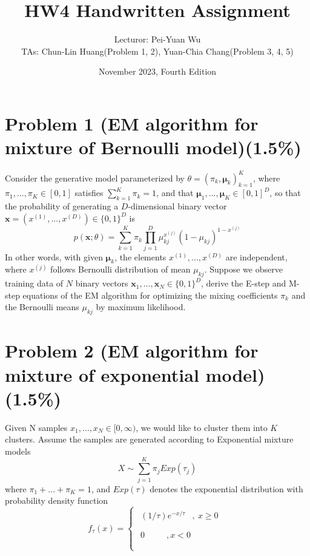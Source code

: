 \documentclass{article}
\title{HW4 Handwritten Assignment}
\author{Lecturor: Pei-Yuan Wu\\
TAs: {Chun-Lin Huang(Problem 1, 2), Yuan-Chia Chang(Problem 3, 4, 5)}}
\date{November 2023, Fourth Edition}
\def\vecx{{\mathbf x}}
\def\vecmu{{\boldsymbol \mu}}
\begin{document}
\maketitle

\section*{Problem 1 (EM algorithm for mixture of Bernoulli model)(1.5\%)}
Consider the generative model parameterized by $\theta = (\pi_k,\vecmu_k)_{k=1}^K$, where $\pi_1,...,\pi_K \in [0,1]$ satisfies $\sum_{k=1}^K\pi_k = 1$, and that $\vecmu_1,...,\vecmu_K  \in [0,1]^D$, so that the probability of generating a $D$-dimensional binary vector $\vecx = (x^{(1)},...,x^{(D)}) \in \{0,1\}^D$ is
\begin{equation*}
p(\vecx; \theta) = \sum_{k=1}^K \pi_k \prod_{j=1}^D \mu_{kj}^{x^{(j)}}(1-\mu_{kj})^{1-x^{(j)}}
\end{equation*}
%
In other words, with given $\vecmu_k$, the elements $x^{(1)},...,x^{(D)}$ are independent, where $x^{(j)}$ follows Bernoulli distribution of mean $\mu_{kj}$.  Suppose we observe training data of $N$ binary vectors $\vecx_1,...,\vecx_N \in \{0,1\}^D$, derive the E-step and M-step equations of the EM algorithm for optimizing the mixing coefficients $\pi_k$ and the Bernoulli means $\mu_{kj}$ by maximum likelihood.

\section*{Problem 2 (EM algorithm for mixture of exponential model)(1.5\%)}
Given N samples \(x_{1},\ldots,x_{N} \in \lbrack 0,\infty)\), we would
like to cluster them into \(K\) clusters. Assume the samples are
generated according to Exponential mixture models
\[X\sim\sum_{j = 1}^{K}{\pi_{j}Exp(\tau_{j})}\]
where \(\pi_{1} + \ldots + \pi_{K} = 1\), and \(Exp(\tau)\) denotes the
exponential distribution with probability density function
\[f_{\tau}(x) = \left\{ \begin{matrix}
\begin{matrix}
(1/\tau)e^{- x/\tau} & ,\ x \geq 0 \\
\end{matrix} \\
\begin{matrix}
0\ \ \ \ \ \ \ \  & ,x < 0 \\
\end{matrix} \\
\end{matrix} \right.\ \]
\end{document}
